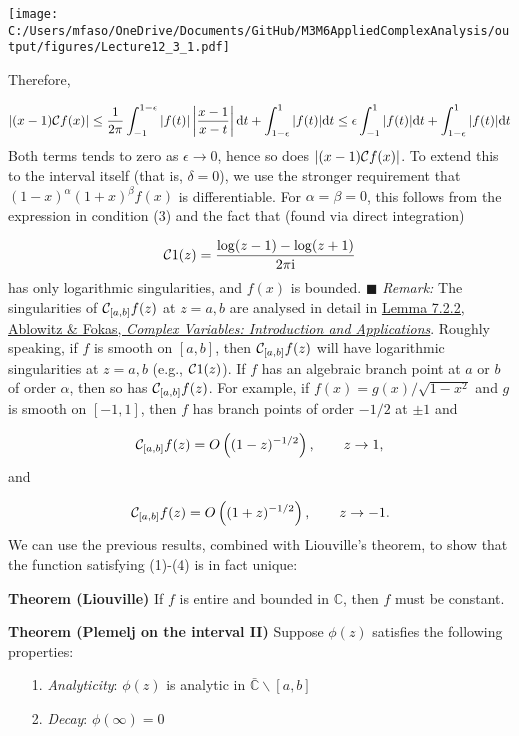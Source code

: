 \documentclass[12pt,landscape]{article}
\def\D{ {\rm d} }
\def\I{ {\rm i} }
\def\C{ {\mathbb C} }
\def\CC{ {\cal C} }
\def\dt{\D t}
\def\cent#1{\begin{center}#1\end{center} }
\begin{document}
{\cent{\texttt{[image: C:/Users/mfaso/OneDrive/Documents/GitHub/M3M6AppliedComplexAnalysis/output/figures/Lecture12\_3\_1.pdf]}}

Therefore,

\[
| (x-1) {\cal C} f(x) | \leq {1 \over 2 \pi}\int_{-1}^{1-\epsilon} |f(t) | \left|{x -1 \over x-t }\right| \dt + \int_{1-\epsilon}^1 |f(t) | \dt \leq
\epsilon \int_{-1}^1 |f(t)| \dt + \int_{1-\epsilon}^1 |f(t) | \dt
\]
Both terms tends to zero as $\epsilon \rightarrow 0$, hence so does $| (x-1) {\cal C} f(x) |$.  To extend this to the interval itself (that is, $\delta = 0$), we  use the stronger requirement that $(1-x)^\alpha(1+x)^\beta f(x)$ is differentiable. For $\alpha = \beta = 0$, this follows from the expression in condition (3) and the fact that (found via direct integration)

\[
    \CC 1(z) =  {\log(z-1) - \log(z+1) \over 2 \pi \I}
\]
has only logarithmic singularities, and $f(x)$ is bounded. \hfill \ensuremath{\blacksquare}
\newpage
\emph{Remark:} The singularities of  $\CC_{[a,b]} f(z)$ at $z = a, b$ are analysed in detail in \href{https://www.imperial.ac.uk/admin-services/library/}{Lemma 7.2.2, Ablowitz \& Fokas, \emph{Complex Variables: Introduction and Applications}}. Roughly speaking, if $f$ is smooth on $[a, b]$, then  $\CC_{[a,b]} f(z)$ will have logarithmic singularities at $z = a, b$ (e.g., $\CC 1(z)$). If $f$ has an algebraic branch point at $a$ or $b$ of order $\alpha$, then so has $\CC_{[a,b]} f(z)$. For example, if $f(x) = g(x)/\sqrt{1 -x^2}$ and $g$ is smooth on $[-1, 1]$, then $f$ has branch points of order $-1/2$ at $\pm 1$ and

\[
\CC_{[a,b]} f(z) = O\left( (1-z)^{-1/2}  \right),\qquad z \to 1,
\]
and

\[
\CC_{[a,b]} f(z) = O\left( (1+z)^{-1/2}  \right),\qquad z \to -1.
\]
\newpage
We can use the previous results, combined with Liouville's theorem, to show that the function satisfying (1)-(4) is in fact unique:

\textbf{Theorem (Liouville)} If $f$ is entire and  bounded in ${\mathbb C}$, then $f$ must be constant.

\textbf{Theorem (Plemelj on the interval II)} Suppose $\phi(z)$ satisfies the following properties:

\begin{itemize}
\item[1. ] \emph{Analyticity}: $\phi(z)$ is analytic in $\bar \C \backslash [a,b]$


\item[2. ] \emph{Decay}: $\phi(\infty) = 0$



\end{itemize}}
\end{document}
